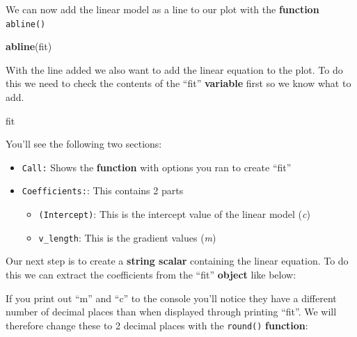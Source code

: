 \documentclass[]{book}
\newenvironment{Shaded}{\begin{snugshade}}{\end{snugshade}}
\newcommand{\KeywordTok}[1]{\textcolor[rgb]{0.13,0.29,0.53}{\textbf{#1}}}
\newcommand{\DecValTok}[1]{\textcolor[rgb]{0.00,0.00,0.81}{#1}}
\newcommand{\StringTok}[1]{\textcolor[rgb]{0.31,0.60,0.02}{#1}}
\newcommand{\OperatorTok}[1]{\textcolor[rgb]{0.81,0.36,0.00}{\textbf{#1}}}
\newcommand{\NormalTok}[1]{#1}
\providecommand{\tightlist}{%
  \setlength{\itemsep}{0pt}\setlength{\parskip}{0pt}}
\begin{document}
We can now add the linear model as a line to our plot with the
\textbf{function} \texttt{abline()}

\begin{Shaded}
\begin{Highlighting}[]
\KeywordTok{abline}\NormalTok{(fit)}
\end{Highlighting}
\end{Shaded}

With the line added we also want to add the linear equation to the plot.
To do this we need to check the contents of the ``fit''
\textbf{variable} first so we know what to add.

\begin{Shaded}
\begin{Highlighting}[]
\NormalTok{fit}
\end{Highlighting}
\end{Shaded}

You'll see the following two sections:

\begin{itemize}
\tightlist
\item
  \texttt{Call:} Shows the \textbf{function} with options you ran to
  create ``fit''
\item
  \texttt{Coefficients:}: This contains 2 parts

  \begin{itemize}
  \tightlist
  \item
    \texttt{(Intercept)}: This is the intercept value of the linear
    model (\emph{c})
  \item
    \texttt{v\_length}: This is the gradient values (\emph{m})
  \end{itemize}
\end{itemize}

Our next step is to create a \textbf{string scalar} containing the
linear equation. To do this we can extract the coefficients from the
``fit'' \textbf{object} like below:

\begin{Shaded}
\end{Shaded}

If you print out ``m'' and ``c'' to the console you'll notice they have
a different number of decimal places than when displayed through
printing ``fit''. We will therefore change these to 2 decimal places
with the \texttt{round()} \textbf{function}:
\end{document}
